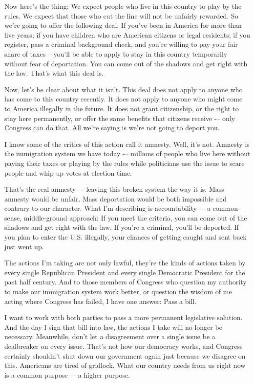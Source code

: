 \documentclass[10pt,a4paper]{article}
\begin{document}
Now here’s the thing: We expect people who live in this country to play by the rules. We expect that those who cut the line will not be unfairly rewarded. So we’re going to offer the following deal: If you’ve been in America for more than five years; if you have children who are American citizens or legal residents; if you register, pass a criminal background check, and you’re willing to pay your fair share of taxes -- you’ll be able to apply to stay in this country temporarily without fear of deportation. You can come out of the shadows and get right with the law. That’s what this deal is.

Now, let’s be clear about what it isn’t. This deal does not apply to anyone who has come to this country recently. It does not apply to anyone who might come to America illegally in the future. It does not grant citizenship, or the right to stay here permanently, or offer the same benefits that citizens receive -– only Congress can do that. All we’re saying is we’re not going to deport you.

I know some of the critics of this action call it amnesty. Well, it’s not. Amnesty is the immigration system we have today -– millions of people who live here without paying their taxes or playing by the rules while politicians use the issue to scare people and whip up votes at election time.

That’s the real amnesty –- leaving this broken system the way it is. Mass amnesty would be unfair. Mass deportation would be both impossible and contrary to our character. What I’m describing is accountability –- a common-sense, middle-ground approach: If you meet the criteria, you can come out of the shadows and get right with the law. If you’re a criminal, you’ll be deported. If you plan to enter the U.S. illegally, your chances of getting caught and sent back just went up.

The actions I’m taking are not only lawful, they’re the kinds of actions taken by every single Republican President and every single Democratic President for the past half century. And to those members of Congress who question my authority to make our immigration system work better, or question the wisdom of me acting where Congress has failed, I have one answer: Pass a bill.

I want to work with both parties to pass a more permanent legislative solution. And the day I sign that bill into law, the actions I take will no longer be necessary. Meanwhile, don’t let a disagreement over a single issue be a dealbreaker on every issue. That’s not how our democracy works, and Congress certainly shouldn’t shut down our government again just because we disagree on this. Americans are tired of gridlock. What our country needs from us right now is a common purpose –- a higher purpose.
\end{document}
